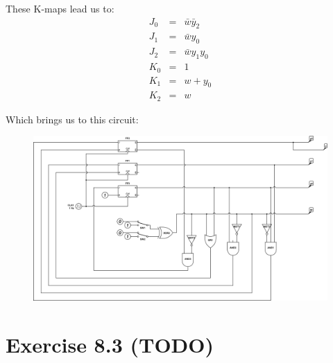 \documentclass[10pt,a4paper]{scrartcl}
\begin{document}
These K-maps lead us to:
\begin{eqnarray*}
    J_0 &=& \bar w\bar y_2\\
    J_1 &=& \bar wy_0\\
    J_2 &=& \bar wy_1y_0\\
    K_0 &=& 1\\
    K_1 &=& w+y_0\\
    K_2 &=& w
\end{eqnarray*}

Which brings us to this circuit:
\begin{figure}[h]
\includegraphics[width=\textwidth]{images/8_2-4counter.png} 
\end{figure}

\FloatBarrier
\section*{Exercise 8.3 (TODO)}
\end{document}

